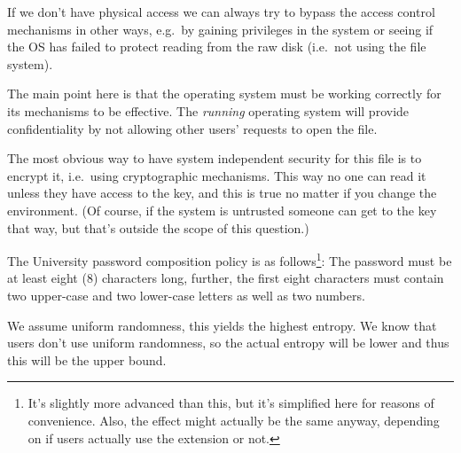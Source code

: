 \documentclass[svv,addpoints]{miunexam}
\begin{document}
\begin{questions}
\begin{solution}
    If we don't have physical access we can always try to bypass the access 
    control mechanisms in other ways, e.g.\ by gaining privileges in the system 
    or seeing if the OS has failed to protect reading from the raw disk (i.e.\ 
    not using the file system).

    The main point here is that the operating system must be working correctly 
    for its mechanisms to be effective.
    The \emph{running} operating system will provide confidentiality by not 
    allowing other users' requests to open the file.

    The most obvious way to have system independent security for this file is 
    to encrypt it, i.e.~using cryptographic mechanisms.
    This way no one can read it unless they have access to the key, and this is 
    true no matter if you change the environment.
    (Of course, if the system is untrusted someone can get to the key that way, 
    but that's outside the scope of this question.)
  \end{solution}


  \question\label{q:infotheory:passwd:E:A}
  The University password composition policy is as follows\footnote{%
    It's slightly more advanced than this, but it's simplified here for reasons 
    of convenience.
    Also, the effect might actually be the same anyway, depending on if users 
    actually use the extension or not.
  }:
  The password must be at least eight (8) characters long, further, the first 
  eight characters must contain two upper-case and two lower-case letters as 
  well as two numbers.

  \begin{solution}
    We assume uniform randomness, this yields the highest entropy.
    We know that users don't use uniform randomness, so the actual entropy will 
    be lower and thus this will be the upper bound.


\end{solution}
\end{questions}
\end{document}
